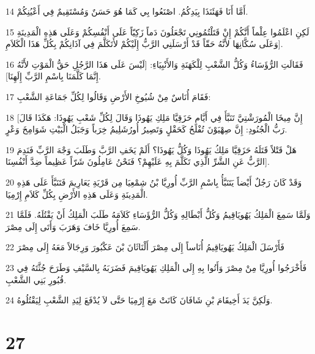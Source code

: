 \par 14 أَمَّا أَنَا فَهَئَنَذَا بِيَدِكُمُ. اصْنَعُوا بِي كَمَا هُوَ حَسَنٌ وَمُسْتَقِيمٌ فِي أَعْيُنِكُمْ.
\par 15 لَكِنِ اعْلَمُوا عِلْماً أَنَّكُمْ إِنْ قَتَلْتُمُونِي تَجْعَلُونَ دَماً زَكِيّاً عَلَى أَنْفُسِكُمْ وَعَلَى هَذِهِ الْمَدِينَةِ وَعَلَى سُكَّانِهَا لأَنَّهُ حَقّاً قَدْ أَرْسَلَنِي الرَّبُّ إِلَيْكُمْ لأَتَكَلَّمَ فِي آذَانِكُمْ بِكُلِّ هَذَا الْكَلاَمِ].
\par 16 فَقَالَتِ الرُّؤَسَاءُ وَكُلُّ الشَّعْبِ لِلْكَهَنَةِ وَالأَنْبِيَاءِ: [لَيْسَ عَلَى هَذَا الرَّجُلِ حَقُّ الْمَوْتِ لأَنَّهُ إِنَّمَا كَلَّمَنَا بِاسْمِ الرَّبِّ إِلَهِنَا].
\par 17 فَقَامَ أُنَاسٌ مِنْ شُيُوخِ الأَرْضِ وَقَالُوا لِكُلِّ جَمَاعَةِ الشَّعْبِ:
\par 18 [إِنَّ مِيخَا الْمُورَشْتِيَّ تَنَبَّأَ فِي أَيَّامِ حَزَقِيَّا مَلِكِ يَهُوذَا وَقَالَ لِكُلِّ شَعْبِ يَهُوذَا: هَكَذَا قَالَ رَبُّ الْجُنُودِ: إِنَّ صِهْيَوْنَ تُفْلَحُ كَحَقْلٍ وَتَصِيرُ أُورُشَلِيمُ خِرَباً وَجَبَلُ الْبَيْتِ شَوَامِخَ وَعْرٍ.
\par 19 هَلْ قَتْلاً قَتَلَهُ حَزَقِيَّا مَلِكُ يَهُوذَا وَكُلُّ يَهُوذَا؟ أَلَمْ يَخَفِ الرَّبَّ وَطَلَبَ وَجْهَ الرَّبِّ فَنَدِمَ الرَّبُّ عَنِ الشَّرِّ الَّذِي تَكَلَّمَ بِهِ عَلَيْهِمْ؟ فَنَحْنُ عَامِلُونَ شَرّاً عَظِيماً ضِدَّ أَنْفُسِنَا].
\par 20 وَقَدْ كَانَ رَجُلٌ أَيْضاً يَتَنَبَّأُ بِاسْمِ الرَّبِّ أُورِيَّا بْنُ شِمْعِيَا مِن قَرْيَةِ يَعَارِيمَ فَتَنَبَّأَ عَلَى هَذِهِ الْمَدِينَةِ وَعَلَى هَذِهِ الأَرْضِ بِكُلِّ كَلاَمِ إِرْمِيَا.
\par 21 وَلَمَّا سَمِعَ الْمَلِكُ يَهُويَاقِيمُ وَكُلُّ أَبْطَالِهِ وَكُلُّ الرُّؤَسَاءِ كَلاَمَهُ طَلَبَ الْمَلِكُ أَنْ يَقْتُلَهُ. فَلَمَّا سَمِعَ أُورِيَّا خَافَ وَهَرَبَ وَأَتَى إِلَى مِصْرَ.
\par 22 فَأَرْسَلَ الْمَلِكُ يَهُويَاقِيمُ أُنَاساً إِلَى مِصْرَ أَلْنَاثَانَ بْنَ عَكْبُورَ وَرِجَالاً مَعَهُ إِلَى مِصْرَ
\par 23 فَأَخْرَجُوا أُورِيَّا مِنْ مِصْرَ وَأَتُوا بِهِ إِلَى الْمَلِكِ يَهُويَاقِيمَ فَضَرَبَهُ بِالسَّيْفِ وَطَرَحَ جُثَّتَهُ فِي قُبُورِ بَنِي الشَّعْبِ.
\par 24 وَلَكِنَّ يَدَ أَخِيقَامَ بْنِ شَافَانَ كَانَتْ مَعَ إِرْمِيَا حَتَّى لاَ يُدْفَعَ لِيَدِ الشَّعْبِ لِيَقْتُلُوهُ.

\chapter{27}

